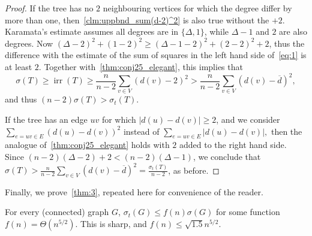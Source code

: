 \documentclass[a4paper,11pt]{article}
\newcommand*{\abs}[1]{\lvert #1\rvert}
\newenvironment{customthm}[1]
 {\renewcommand\theinnercustomthm{#1}\innercustomthm}
 {\endinnercustomthm}
\DeclareMathOperator{\irr}{irr}
\begin{document}
\begin{proof}
    If the tree has no $2$ neighbouring vertices for which the degree differ by more than one, then~\cref{clm:uppbnd_sum(d-2)^2} is also true without the $+2$.
    Karamata's estimate assumes all degrees are in $\{\Delta,1 \}$, while $ \Delta-1$ and $ 2$ are also degrees.
    Now $(\Delta-2)^2 + (1-2)^2 \ge (\Delta-1 -2)^2+(2-2)^2+2$, thus the difference with the estimate of the sum of squares in the left hand side of~\eqref{eq:1} is at least $2$.
    Together with~\cref{thm:conj25_elegant}, this implies that
     $$ \sigma(T) \ge \irr(T) \ge \frac{n}{n-2} \sum_{v \in V} ( d(v)-2)^2 > \frac{n}{n-2} \sum_{v \in V} ( d(v)-\overline d)^2 ,$$
     and thus $(n-2)\sigma(T)> \sigma_t(T).$

     If the tree has an edge $uv$ for which $\abs{d(u)-d(v)} \ge 2$, and we consider $\sum_{e=uv \in E} (d(u)-d(v))^2$ instead of $\sum_{e=uv \in E} \abs{d(u)-d(v)},$ then the analogue of~\cref{thm:conj25_elegant} holds with $2$ added to the right hand side.
     Since $(n-2)(\Delta-2)+2 < (n-2)(\Delta-1)$, we conclude that $\sigma(T) > \frac{n}{n-2} \sum_{v \in V} ( d(v)-\overline d)^2=\frac{\sigma_t(T)}{n-2}$, as before.
\end{proof}

Finally, we prove~\cref{thm:3}, repeated here for convenience of the reader.

\begin{customthm} {\bf \ref{thm:3}}
    For every (connected) graph $G$, $\sigma_t(G) \le f(n) \sigma(G)$ for some function $f(n)= \Theta(n^{5/2})$. This is sharp, and $f(n) \le \sqrt{1.5} n^{5/2}.$
\end{customthm}
\end{document}
